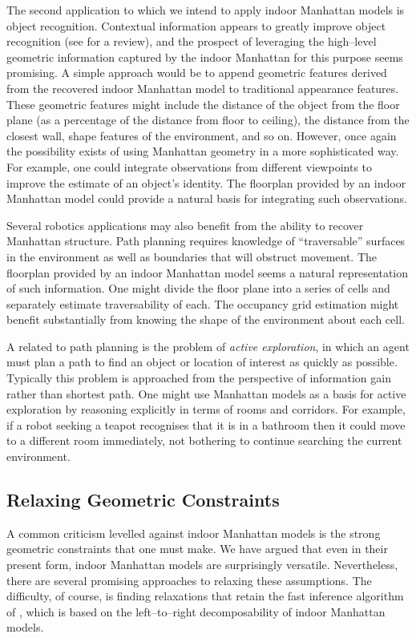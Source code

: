 The second application to which we intend to apply indoor Manhattan
models is object recognition. Contextual information appears to
greatly improve object recognition (see  for a
review), and the prospect of leveraging the high--level geometric
information captured by the indoor Manhattan for this purpose seems
promising. A simple approach would be to append geometric features
derived from the recovered indoor Manhattan model to traditional
appearance features. These geometric features might include the
distance of the object from the floor plane (as a percentage of the
distance from floor to ceiling), the distance from the closest wall,
shape features of the environment, and so on. However, once again the
possibility exists of using Manhattan geometry in a more sophisticated
way. For example, one could integrate observations from different
viewpoints to improve the estimate of an object's identity. The
floorplan provided by an indoor Manhattan model could provide a
natural basis for integrating such observations.

Several robotics applications may also benefit from the ability to
recover Manhattan structure. Path planning requires knowledge of
``traversable'' surfaces in the environment as well as boundaries that
will obstruct movement. The floorplan provided by an indoor Manhattan
model seems a natural representation of such information. One might
divide the floor plane into a series of cells and separately estimate
traversability of each. The occupancy grid estimation might benefit
substantially from knowing the shape of the environment about each
cell.

A related to path planning is the problem of \textit{active
  exploration}, in which an agent must plan a path to find an object
or location of interest as quickly as possible. Typically this problem
is approached from the perspective of information gain rather than
shortest path. One might use Manhattan models as a basis for active
exploration by reasoning explicitly in terms of rooms and
corridors. For example, if a robot seeking a teapot recognises that it
is in a bathroom then it could move to a different room immediately,
not bothering to continue searching the current environment.

\subsection{Relaxing Geometric Constraints}

A common criticism levelled against indoor Manhattan models is the
strong geometric constraints that one must make. We have argued that
even in their present form, indoor Manhattan models are surprisingly
versatile. Nevertheless, there are several promising approaches to
relaxing these assumptions. The difficulty, of course, is finding
relaxations that retain the fast inference algorithm of
, which is based on the left--to--right
decomposability of indoor Manhattan models.

